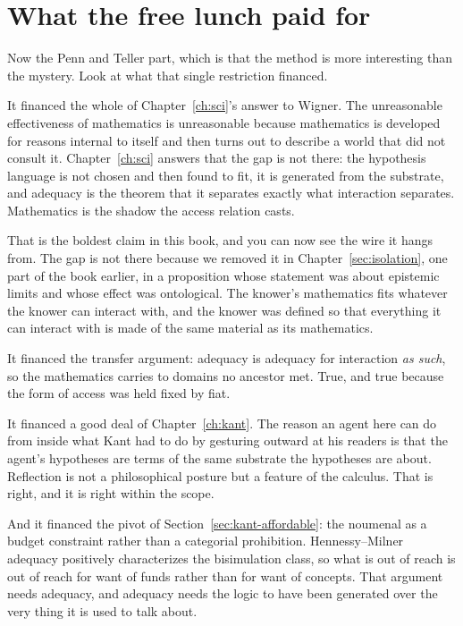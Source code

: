 \section{What the free lunch paid for}
\label{sec:what-it-bought}

Now the Penn and Teller part, which is that the method is more
interesting than the mystery.
Look at what that single restriction financed.

It financed the whole of Chapter~\ref{ch:sci}'s answer to Wigner.
The unreasonable effectiveness of mathematics is unreasonable
because mathematics is developed for reasons internal to itself and
then turns out to describe a world that did not consult it.
Chapter~\ref{ch:sci} answers that the gap is not there: the
hypothesis language is not chosen and then found to fit, it is
generated from the substrate, and adequacy is the theorem that it
separates exactly what interaction separates.
Mathematics is the shadow the access relation casts.

That is the boldest claim in this book, and you can now see the
wire it hangs from.
The gap is not there because we removed it in
Chapter~\ref{sec:isolation}, one part of the book earlier, in a
proposition whose statement was about epistemic limits and whose
effect was ontological.
The knower's mathematics fits whatever the knower can interact
with, and the knower was defined so that everything it can interact
with is made of the same material as its mathematics.

It financed the transfer argument: adequacy is adequacy for
interaction \emph{as such}, so the mathematics carries to domains
no ancestor met.
True, and true because the form of access was held fixed by fiat.

It financed a good deal of Chapter~\ref{ch:kant}.
The reason an agent here can do from inside what Kant had to do by
gesturing outward at his readers is that the agent's hypotheses are
terms of the same substrate the hypotheses are about.
Reflection is not a philosophical posture but a feature of the
calculus.
That is right, and it is right within the scope.

And it financed the pivot of Section~\ref{sec:kant-affordable}: the
noumenal as a budget constraint rather than a categorial
prohibition.
Hennessy--Milner adequacy positively characterizes the
bisimulation class, so what is out of reach is out of reach for
want of funds rather than for want of concepts.
That argument needs adequacy, and adequacy needs the logic to have
been generated over the very thing it is used to talk about.

